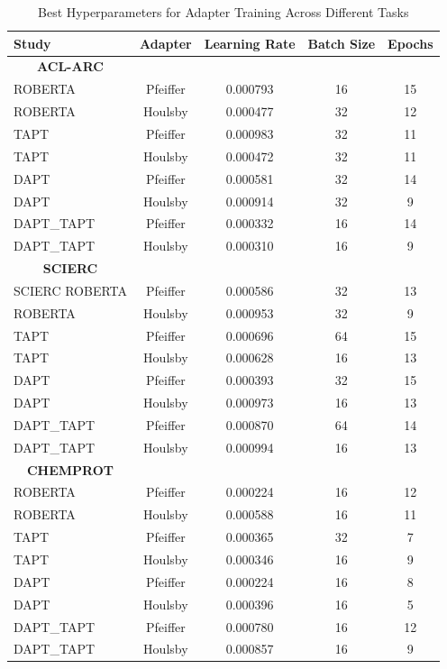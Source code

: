 \documentclass[10pt,twocolumn,letterpaper]{article}
\begin{document}
\begin{table}[H]

    \centering
    \caption{Best Hyperparameters for Adapter Training Across Different Tasks}
    \begin{tabular}{@{}lcccc@{}}
    \hline
    \textbf{Study} & \textbf{Adapter} & \textbf{Learning Rate} & \textbf{Batch Size} & \textbf{Epochs} \\
    \hline
    \multicolumn{1}{c}{\textbf{ACL-ARC}} \\
    ROBERTA & Pfeiffer & 0.000793 & 16 & 15 \\
    ROBERTA & Houlsby & 0.000477 & 32 & 12 \\
    TAPT & Pfeiffer & 0.000983 & 32 & 11 \\
    TAPT & Houlsby & 0.000472 & 32 & 11 \\
    DAPT & Pfeiffer & 0.000581 & 32 & 14 \\
    DAPT & Houlsby & 0.000914 & 32 & 9 \\
    DAPT\_TAPT & Pfeiffer & 0.000332 & 16 & 14 \\
    DAPT\_TAPT & Houlsby & 0.000310 & 16 & 9 \\
    \hline
    \multicolumn{1}{c}{\textbf{SCIERC}} \\
    SCIERC
    ROBERTA & Pfeiffer & 0.000586 & 32 & 13 \\
    ROBERTA & Houlsby & 0.000953 & 32 & 9 \\
    TAPT & Pfeiffer & 0.000696 & 64 & 15 \\
    TAPT & Houlsby & 0.000628 & 16 & 13 \\
    DAPT & Pfeiffer & 0.000393 & 32 & 15 \\
    DAPT & Houlsby & 0.000973 & 16 & 13 \\
    DAPT\_TAPT & Pfeiffer & 0.000870 & 64 & 14 \\
    DAPT\_TAPT & Houlsby & 0.000994 & 16 & 13 \\
    \hline
    \multicolumn{1}{c}{\textbf{CHEMPROT}} \\
    ROBERTA & Pfeiffer & 0.000224 & 16 & 12 \\
    ROBERTA & Houlsby & 0.000588 & 16 & 11 \\
    TAPT & Pfeiffer & 0.000365 & 32 & 7 \\
    TAPT & Houlsby & 0.000346 & 16 & 9 \\
    DAPT & Pfeiffer & 0.000224 & 16 & 8 \\
    DAPT & Houlsby & 0.000396 & 16 & 5 \\
    DAPT\_TAPT & Pfeiffer & 0.000780 & 16 & 12 \\
    DAPT\_TAPT & Houlsby & 0.000857 & 16 & 9 \\
    \hline
    \end{tabular}
    \label{table:best_hyperparameters_adapters}
\end{table}
\end{document}
